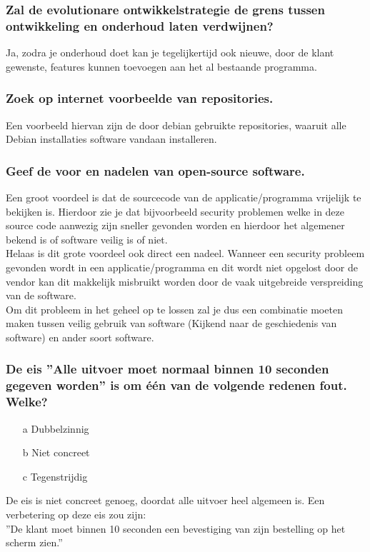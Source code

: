 \documentclass[a4paper,titlepage]{artikel1}
\begin{document}
   \subsubsection[Opdracht 5]{Zal de evolutionare ontwikkelstrategie de grens tussen ontwikkeling en onderhoud laten verdwijnen?}
   Ja, zodra je onderhoud doet kan je tegelijkertijd ook nieuwe, door de klant gewenste, features kunnen toevoegen aan het al bestaande programma. 
   
   \subsubsection[Opdracht 6]{Zoek op internet voorbeelde van repositories.}
   Een voorbeeld hiervan zijn de door debian gebruikte repositories, waaruit alle Debian installaties software vandaan installeren.
   
   \subsubsection[Opdracht 7]{Geef de voor en nadelen van open-source software.}
   Een groot voordeel is dat de sourcecode van de applicatie/programma vrijelijk te bekijken is. Hierdoor zie je dat bijvoorbeeld security problemen welke in deze source code aanwezig zijn sneller gevonden worden en hierdoor het algemener bekend is of software veilig is of niet.
   \\
   Helaas is dit grote voordeel ook direct een nadeel. Wanneer een security probleem gevonden wordt in een applicatie/programma en dit wordt niet opgelost door de vendor kan dit makkelijk misbruikt worden door de vaak uitgebreide verspreiding van de software. 
   \\ 
   Om dit probleem in het geheel op te lossen zal je dus een combinatie moeten maken tussen veilig gebruik van software (Kijkend naar de geschiedenis van software) en ander soort software.
   
   \subsubsection[Opdracht 8]{De eis ''Alle uitvoer moet normaal binnen 10 seconden gegeven worden'' is om \'{e}\'{e}n van de volgende redenen fout. Welke?}
   \begin{itemize}
    \item[a] Dubbelzinnig
    \item[b] Niet concreet
    \item[c] Tegenstrijdig
   \end{itemize}
   De eis is niet concreet genoeg, doordat alle uitvoer heel algemeen is. Een verbetering op deze eis zou zijn:\\
   ''De klant moet binnen 10 seconden een bevestiging van zijn bestelling op het scherm zien.''
   
\end{document}
